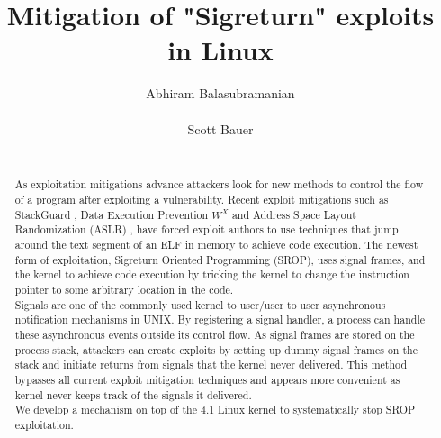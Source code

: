 \documentclass{sig-alternate-05-2015}
\begin{document}
\title{Mitigation of "Sigreturn" exploits in Linux}
\author{
\alignauthor
Abhiram Balasubramanian\\
       \\
\alignauthor
Scott Bauer\\
       \\
}

\maketitle
\begin{abstract}
As exploitation mitigations advance attackers look for new methods to control the flow of a program after exploiting a vulnerability. Recent exploit mitigations such as StackGuard \cite{cowan1998stackguard}, Data Execution Prevention \(W^X\) \cite{WXORX} and Address Space Layout Randomization (ASLR) \cite{ASLR}, have forced exploit authors to use techniques that jump around the text segment of an ELF in memory to achieve code execution. The newest form of exploitation, Sigreturn Oriented Programming (SROP), uses signal frames, and the kernel to achieve code execution by tricking the kernel to change the instruction pointer to some arbitrary location in the code.\\
Signals are one of the commonly used kernel to user/user to user asynchronous notification mechanisms in UNIX. By registering a signal handler, a process can handle these asynchronous events outside its control flow. As signal frames are stored on the process stack, attackers can create exploits by setting up dummy signal frames on the stack and initiate returns from signals that the kernel never delivered. This method bypasses all current exploit mitigation techniques and  appears more convenient as kernel never keeps track of the signals it delivered.\\
We develop a mechanism on top of the 4.1 Linux kernel to systematically stop SROP exploitation.

\end{abstract}
\end{document}
